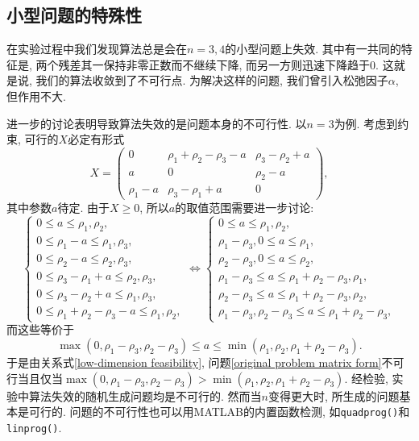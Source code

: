 \documentclass[UTF8,10.5pt,a4paper]{ctexart}
\theoremstyle{definition}
\theoremstyle{definition}
\begin{document}
\subsection{小型问题的特殊性}
在实验过程中我们发现算法总是会在$n=3,4$的小型问题上失效. 其中有一共同的特征是, 两个残差其一保持非零正数而不继续下降, 而另一方则迅速下降趋于0. 这就是说, 我们的算法收敛到了不可行点. 为解决这样的问题, 我们曾引入松弛因子$\alpha$, 但作用不大. 
\par 进一步的讨论表明导致算法失效的是问题本身的不可行性. 以$n=3$为例. 考虑到约束, 可行的$X$必定有形式
$$X=\begin{pmatrix}
	0 & \rho_1+\rho_2-\rho_3-a & \rho_3-\rho_2+a\\
	a & 0 & \rho_2-a\\
	\rho_1-a & \rho_3-\rho_1+a & 0
\end{pmatrix},$$
其中参数$a$待定. 由于$X\ge0$, 所以$a$的取值范围需要进一步讨论:
$$\left\{\begin{array}{l}
	0\le a\le\rho_1,\rho_2,\\
	0\le\rho_1-a\le\rho_1,\rho_3,\\
	0\le\rho_2-a\le\rho_2,\rho_3,\\
	0\le\rho_3-\rho_1+a\le\rho_2,\rho_3,\\
	0\le\rho_3-\rho_2+a\le\rho_1,\rho_3,\\
	0\le\rho_1+\rho_2-\rho_3-a\le\rho_1,\rho_2,
\end{array}\right.\Leftrightarrow
\left\{\begin{array}{l}
	0\le a\le\rho_1,\rho_2,\\
	\rho_1-\rho_3,0\le a\le\rho_1,\\
	\rho_2-\rho_3,0\le a\le\rho_2,\\
	\rho_1-\rho_3\le a\le\rho_1+\rho_2-\rho_3,\rho_1,\\
	\rho_2-\rho_3\le a\le\rho_1+\rho_2-\rho_3,\rho_2,\\
	\rho_1-\rho_3,\rho_2-\rho_3\le a\le\rho_1+\rho_2-\rho_3,
\end{array}\right.$$
而这些等价于
\begin{equation}
	\max(0,\rho_1-\rho_3,\rho_2-\rho_3)\le a\le\min(\rho_1,\rho_2,\rho_1+\rho_2-\rho_3).
	\label{low-dimension feasibility}
\end{equation}
于是由关系式\eqref{low-dimension feasibility}, 问题\eqref{original problem matrix form}不可行当且仅当$\max(0,\rho_1-\rho_3,\rho_2-\rho_3)>\min(\rho_1,\rho_2,\rho_1+\rho_2-\rho_3)$. 经检验, 实验中算法失效的随机生成问题均是不可行的. 然而当$n$变得更大时, 所生成的问题基本是可行的. 问题的不可行性也可以用MATLAB的内置函数检测, 如\texttt{quadprog()}和\texttt{linprog()}.
\end{document}
